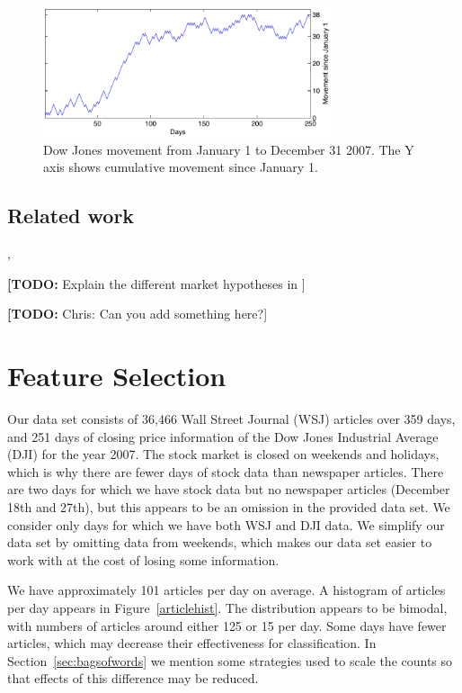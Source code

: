 \documentclass[10pt, twocolumn]{article}
\def\TODO#1{\noindent\textbf{[TODO:} #1]}
\begin{document}
\begin{figure}
\includegraphics[width=8.5cm]{experiments/dj_performance.pdf}
\caption{Dow Jones movement from January 1 to December 31 2007. The Y axis shows cumulative movement since January 1.}
\label{fig:dj-preformance}
\end{figure}

\subsection{Related work}
\cite{twitter}, \cite{mlstockmarket}




\TODO{Explain the different market hypotheses in \cite{mlstockmarket}}

\TODO{Chris: Can you add something here?}

\section{Feature Selection}
\label{sec:features}

Our data set consists of 36,466 Wall Street Journal (WSJ) articles over 359 days, and 251 days of closing price information of the Dow Jones Industrial Average (DJI) for the year 2007. The stock market is closed on weekends and holidays, which is why there are fewer days of stock data than newspaper articles. There are two days for which we have stock data but no newspaper articles (December 18th and 27th), but this appears to be an omission in the provided data set. We consider only days for which we have both WSJ and DJI data. We simplify our data set by omitting data from weekends, which makes our data set easier to work with at the cost of losing some information.

We have approximately 101 articles per day on average. A histogram of articles per day appears in Figure~\ref{articlehist}. The distribution appears to be bimodal, with numbers of articles around either 125 or 15 per day. Some days have fewer articles, which may decrease their effectiveness for classification. In Section~\ref{sec:bagsofwords} we mention some strategies used to scale the counts so that effects of this difference may be reduced.
\end{document}
